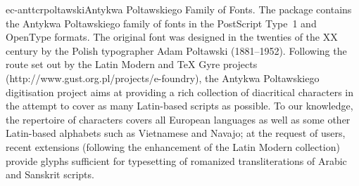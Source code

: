 \documentclass{ddltxtyp}
\begin{document}
\begin{package}{ec-anttcr}{poltawski}{Antykwa Poltawskiego Family of Fonts.}
The package contains the Antykwa Poltawskiego family of fonts
in the PostScript Type~1 and OpenType formats. The original
font was designed in the twenties of the XX century by the
Polish typographer Adam Poltawski (1881--1952). Following the
route set out by the Latin Modern and {\TeX} Gyre projects
(http://www.gust.org.pl/projects/e-foundry), the Antykwa
Poltawskiego digitisation project aims at providing a rich
collection of diacritical characters in the attempt to cover as
many Latin-based scripts as possible. To our knowledge, the
repertoire of characters covers all European languages as well
as some other Latin-based alphabets such as Vietnamese and
Navajo; at the request of users, recent extensions (following
the enhancement of the Latin Modern collection) provide glyphs
sufficient for typesetting of romanized transliterations of
Arabic and Sanskrit scripts. %
\end{package}
\end{document}
